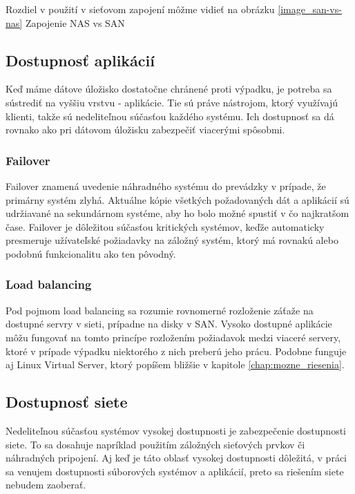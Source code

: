 Rozdiel v použití v sieťovom zapojení môžme vidieť na obrázku \ref{image_san-vs-nas}
 {Zapojenie NAS vs SAN}

\subsection{Dostupnosť aplikácií}
Keď máme dátove úložisko dostatočne chránené proti výpadku, je potreba sa sústrediť na vyššiu vrstvu - aplikácie. Tie sú práve nástrojom, ktorý využívajú klienti, takže sú nedeliteľnou súčasťou každého systému. Ich dostupnosť sa dá rovnako ako pri dátovom úložisku zabezpečiť viacerými spôsobmi.

\subsubsection{Failover}
Failover znamená uvedenie náhradného systému do prevádzky v prípade, že primárny systém zlyhá. Aktuálne kópie všetkých požadovaných dát a aplikácií sú udržiavané na sekundárnom systéme, aby ho bolo možné spustiť v čo najkratšom čase. \cite{web:pcmag.com-failover}
Failover je dôležitou súčasťou kritických systémov, keďže automaticky presmeruje užívateľské požiadavky na záložný systém, ktorý má rovnakú alebo podobnú funkcionalitu ako ten pôvodný.

\subsubsection{Load balancing}
Pod pojmom load balancing sa rozumie rovnomerné rozloženie záťaže na dostupné servry v sieti, prípadne na disky v SAN. Vysoko dostupné aplikácie môžu fungovať na tomto princípe rozložením požiadavok medzi viaceré servery, ktoré v prípade výpadku niektorého z nich preberú jeho prácu. Podobne funguje aj Linux Virtual Server, ktorý popíšem bližšie v kapitole \ref{chap:mozne_riesenia}.

\subsection{Dostupnosť siete}
Nedeliteľnou súčasťou systémov vysokej dostupnosti je zabezpečenie dostupnosti siete. To sa dosahuje napríklad použitím záložných sieťových prvkov či náhradných pripojení. Aj keď je táto oblasť vysokej dostupnosti dôležitá, v práci sa venujem dostupnosti súborových systémov a aplikácií, preto sa riešením siete nebudem zaoberať.

\emptydoublepage